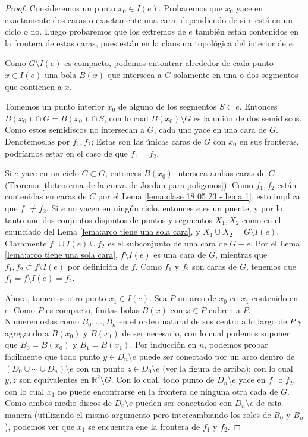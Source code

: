\documentclass[12pt]{report}
\theoremstyle{plain}
\theoremstyle{definition}
\newcommand{\reals}{\mathbb{R}}
\begin{document}
\begin{proof}
Consideremos un punto $x_0 \in I(e)$. Probaremos que $x_0$ yace en exactamente dos caras o exactamente una cara, dependiendo de si $e$ está en un ciclo o no. Luego probaremos que los extremos de $e$ también están contenidos en la frontera de estas caras, pues están en la clausura topológica del interior de $e$.

Como $G \setminus I(e)$ es compacto, podemos entontrar alrededor de cada punto $x \in I(e)$ una bola $B (x)$ que interseca a $G$ solamente en una o dos segmentos que contienen a $x$.

Tomemos un punto interior $x_0$ de alguno de los segmentos $S \subset e$. Entonces $B(x_0) \cap G = B(x_0) \cap S$, con lo cual $B(x_0) \setminus G$ es la unión de dos semidiscos. Como estos semidiscos no intersecan a $G$, cada uno yace en una cara de $G$. Denotemoslas por $f_1,f_2$; Estas son las únicas caras de $G$ con $x_0$ en sus fronteras, podríamos estar en el caso de que $f_1 = f_2$.

Si $e$ yace en un ciclo $C \subset G$, entonces $B (x_0)$ interseca ambas caras de $C$ (Teorema \ref{th:teorema de la curva de Jordan para poligonos}). Como $f_1,f_2$ están contenidas en caras de $C$ por el Lema \ref{lema:clase 18 05 23 - lema 1}, esto implica que $f_1 \neq f_2$. Si $e$ no yacen en ningún ciclo, entonces $e$ es un puente, y por lo tanto une dos conjuntos disjuntos de puntos y segmentos $X_1,X_2$ como en el enunciado del Lema \ref{lema:arco tiene una sola cara}, y $X_1 \cup X_2 = G \setminus I(e)$. Claramente $f_1 \cup I(e) \cup f_2$ es el subconjunto de una cara de $G - e$. Por el Lema \ref{lema:arco tiene una sola cara}, $f \setminus I(e)$ es una cara de $G$, mientras que $f_1, f_2 \subset f \setminus I(e)$ por definición de $f$. Como $f_1$ y $f_2$ son caras de $G$, tenemos que $f_1 = f \setminus I(e) = f_2$.


Ahora, tomemos otro punto $x_1 \in I(e)$. Sea $P$ un arco de $x_0$ en $x_1$ contenido en $e$. Como $P$ es compacto, finitas bolas $B(x)$ con $x \in P$ cubren a $P$. Numeremoslas como $B_0 , \ldots, B_n$ en el orden natural de sus centro a lo largo de $P$ y agregando a $B (x_0)$ y $B (x_1)$ de ser necesario, con lo cual podemos suponer que $B_0 = B(x_0)$ y $B_1 = B(x_1)$. Por inducción en $n$, podemos probar fácilmente que todo punto $y \in D_n \setminus e$ puede ser conectado por un arco dentro de $(D_0 \cup \cdots \cup D_n) \setminus e$ con un punto $z \in D_0 \setminus e$ (ver la figura de arriba); con lo cual $y,z$ son equivalentes en $\reals^2 \setminus G$. Con lo cual, todo punto de $D_n \setminus e$ yace en $f_1$ o $f_2$, con lo cual $x_1$ no puede encontrarse en la frontera de ninguna otra cada de $G$. Como ambos medio-discos de $D_0 \setminus e$ pueden ser conectados con $D_n \setminus e$ de esta manera (utilizando el mismo argumento pero intercambiando los roles de $B_0$ y $B_n$), podemos ver que $x_1$ se encuentra ene la frontera de $f_1$ y $f_2$.
\end{proof}
\end{document}

